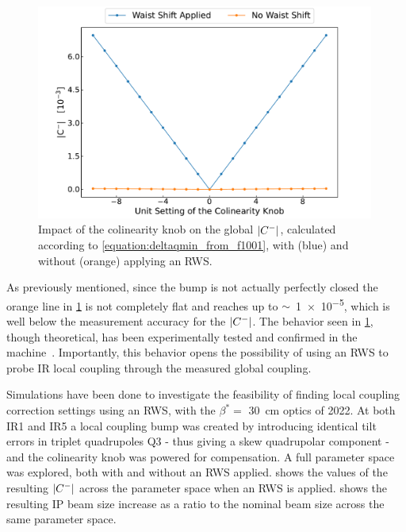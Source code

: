 \begin{figure}[!htb]
    \centering
    \includegraphics*[width=0.99\textwidth]{Figures/IR_Coupling_Correction/colin_knob_vs_waist_shift.pdf}
    \caption{Impact of the colinearity knob on the global \(\left\lvert C^{-} \right\rvert\), calculated according to \cref{equation:deltaqmin_from_f1001}, with (\textcolor{mplblue}{blue}) and without (\textcolor{mplorange}{orange}) applying an RWS.}
    \label{figure:knob_to_cminus_with_waist}
\end{figure}

As previously mentioned, since the bump is not actually perfectly closed the \textcolor{mplorange}{orange} line in \cref{figure:knob_to_cminus_with_waist} is not completely flat and reaches up to \(\sim\)~\num{1e-5}, which is well below the measurement accuracy for the \(\left\lvert C^{-} \right\rvert\).
The behavior seen in \cref{figure:knob_to_cminus_with_waist}, though theoretical, has been experimentally tested and confirmed in the machine~\cite{CERN:Persson:Local_Coupling_IP}.
Importantly, this behavior opens the possibility of using an RWS to probe IR local coupling through the measured global coupling.

Simulations have been done to investigate the feasibility of finding local coupling correction settings using an RWS, with the \(\beta^{\ast} = \) \qty{30}{cm} optics of \num{2022}.
At both IR\num{1} and IR\num{5} a local coupling bump was created by introducing identical tilt errors in triplet quadrupoles Q\num{3} - thus giving a skew quadrupolar component - and the colinearity knob was powered for compensation.
A full parameter space was explored, both with and without an RWS applied.
 shows the values of the resulting \(\left\lvert C^{-} \right\rvert\) across the parameter space when an RWS is applied.
 shows the resulting IP beam size increase as a ratio to the nominal beam size across the same parameter space.

